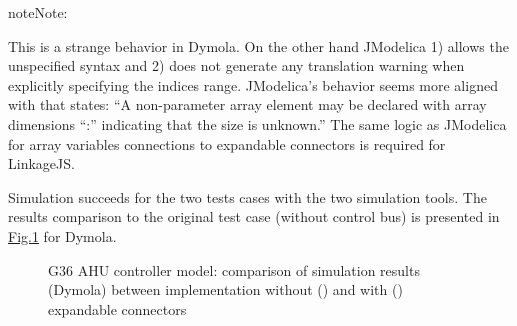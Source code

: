 \documentclass[letterpaper,10pt, openany,english]{sphinxmanual}
\begin{document}
\begin{sphinxadmonition}{note}{Note:}
\begin{sphinxVerbatim}[commandchars=\\\{\}]
 \PYG{p}{[}\PYG{p}{]}

  
\PYG{p}{[}\PYG{p}{]}  
\PYG{p}{[}\PYG{p}{]}  
\PYG{p}{[}\PYG{p}{]} 
\PYG{p}{[}\PYG{p}{]} 
\end{sphinxVerbatim}

This is a strange behavior in Dymola. On the other hand JModelica 1) allows the unspecified \sphinxcode{\sphinxupquote{{[}:{]}}} syntax and 2) does not generate any translation warning when explicitly specifying the indices range.
JModelica’s behavior seems more aligned with   that states: “A non-parameter array element may be declared with array dimensions “:” indicating that the size is unknown.”
The same logic as JModelica for array variables connections to expandable connectors is required for LinkageJS.
\end{sphinxadmonition}

Simulation succeeds for the two tests cases with the two simulation tools.
The results comparison to the original test case (without control bus) is presented in \hyperref[\detokenize{requirements:annex-valid-bus}]{Fig.\@ \ref{\detokenize{requirements:annex-valid-bus}}} for Dymola.

\begin{figure}[htbp]
\centering
\capstart

\noindent{}
\caption{G36 AHU controller model: comparison of simulation results (Dymola) between implementation without () and with () expandable connectors}\label{\detokenize{requirements:annex-valid-bus}}\end{figure}
\end{document}
